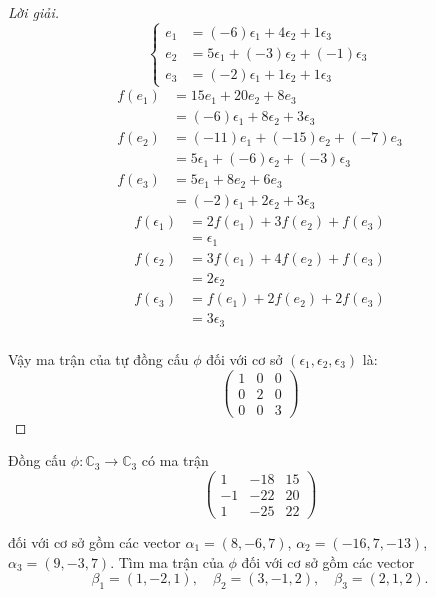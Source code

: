 \documentclass[class=linearalgebra,crop=false]{standalone}
\begin{document}
\begin{proof}[Lời giải]
    \[
        \begin{cases}
            e_{1} & = (-6)\epsilon_{1} + 4\epsilon_{2} + 1\epsilon_{3} \\
            e_{2} & = 5\epsilon_{1} + (-3)\epsilon_{2} + (-1)\epsilon_{3} \\
            e_{3} & = (-2)\epsilon_{1} + 1\epsilon_{2} + 1\epsilon_{3}
        \end{cases}
    \]
    \begin{align*}
        f(e_{1}) & = 15e_{1} + 20e_{2} + 8e_{3} \\
                 & = (-6)\epsilon_{1} + 8\epsilon_{2} + 3\epsilon_{3} \\
        f(e_{2}) & = (-11)e_{1} + (-15)e_{2} + (-7)e_{3} \\
                 & = 5\epsilon_{1} + (-6)\epsilon_{2} + (-3)\epsilon_{3} \\
        f(e_{3}) & = 5e_{1} + 8e_{2} + 6e_{3} \\
                 & = (-2)\epsilon_{1} + 2\epsilon_{2} + 3\epsilon_{3}
    \end{align*}
    \begin{align*}
        f(\epsilon_{1}) & = 2f(e_{1}) + 3f(e_{2}) + f(e_{3}) \\
                        & = \epsilon_{1} \\
        f(\epsilon_{2}) & = 3f(e_{1}) + 4f(e_{2}) + f(e_{3}) \\
                        & = 2\epsilon_{2} \\
        f(\epsilon_{3}) & = f(e_{1}) + 2f(e_{2}) + 2f(e_{3}) \\
                        & = 3\epsilon_{3} \\
    \end{align*}
    \par Vậy ma trận của tự đồng cấu $\phi$ đối với cơ sở $(\epsilon_{1}, \epsilon_{2}, \epsilon_{3})$ là:
    \[
        \begin{pmatrix}
            1 & 0 & 0 \\
            0 & 2 & 0 \\
            0 & 0 & 3
        \end{pmatrix}
    \]
\end{proof}

\begin{exercise}
    Đồng cấu $\phi: \mathbb{C}_{3}\to\mathbb{C}_{3}$ có ma trận
    \[
        \begin{pmatrix}
            1  & -18 & 15 \\
            -1 & -22 & 20 \\
            1  & -25 & 22
        \end{pmatrix}
    \]
    \par đối với cơ sở gồm các vector $\alpha_{1} = (8, -6, 7)$, $\alpha_{2} = (-16, 7, -13)$, $\alpha_{3} = (9, -3, 7)$. Tìm ma trận của $\phi$ đối với cơ sở gồm các vector
    \[
        \beta_{1} = (1, -2, 1),\quad\beta_{2} = (3, -1, 2),\quad\beta_{3} = (2, 1, 2).
    \]
\end{exercise}
\end{document}
